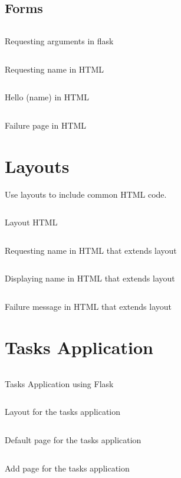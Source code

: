 \subsection{Forms}
\begin{code}
	\inputminted{python}{codes/web/flask/hello3/application.py}
	\caption{Requesting arguments in flask}
\end{code}
\clearpage
\begin{code}
	\inputminted{html}{codes/web/flask/hello3/templates/index.html}
	\caption{Requesting name in HTML}
\end{code}
\begin{code}
	\inputminted{html}{codes/web/flask/hello3/templates/hello.html}
	\caption{Hello (name) in HTML}
\end{code}
\clearpage
\begin{code}
	\inputminted{html}{codes/web/flask/hello3/templates/failure.html}
	\caption{Failure page in HTML}
\end{code}

\clearpage
\section{Layouts}
Use layouts to include common HTML code.
\begin{code}
	\inputminted{html}{codes/web/flask/hello4/templates/layout.html}
	\caption{Layout HTML}
\end{code}
\begin{code}
	\inputminted{html}{codes/web/flask/hello4/templates/index.html}
	\caption{Requesting name in HTML that extends layout}
\end{code}
\begin{code}
	\inputminted{html}{codes/web/flask/hello4/templates/hello.html}
	\caption{Displaying name in HTML that extends layout}
\end{code}
\begin{code}
	\inputminted{html}{codes/web/flask/hello4/templates/failure.html}
	\caption{Failure message in HTML that extends layout}
\end{code}

\section{Tasks Application}
\begin{code}
	\inputminted{python}{codes/web/flask/tasks/application.py}
	\caption{Tasks Application using Flask}
\end{code}
\clearpage
\begin{code}
	\inputminted{html}{codes/web/flask/tasks/templates/layout.html}
	\caption{Layout for the tasks application}
\end{code}
\begin{code}
	\inputminted{html}{codes/web/flask/tasks/templates/tasks.html}
	\caption{Default page for the tasks application}
\end{code}
\clearpage
\begin{code}
	\inputminted{html}{codes/web/flask/tasks/templates/add.html}
	\caption{Add page for the tasks application}
\end{code}